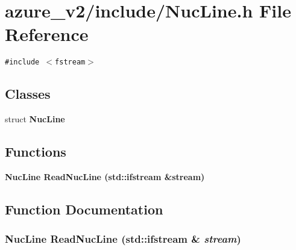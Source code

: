 \section{azure\_\-v2/include/Nuc\-Line.h File Reference}
\label{NucLine_8h}
{\tt \#include $<$fstream$>$}\par
\subsection*{Classes}
\begin{CompactItemize}
\item 
struct \bf{Nuc\-Line}
\end{CompactItemize}
\subsection*{Functions}
\begin{CompactItemize}
\item 
\bf{Nuc\-Line} \bf{Read\-Nuc\-Line} (std::ifstream \&stream)
\end{CompactItemize}


\subsection{Function Documentation}
\subsubsection{\setlength{\rightskip}{0pt plus 5cm}\bf{Nuc\-Line} Read\-Nuc\-Line (std::ifstream \& {\em stream})}\label{NucLine_8h_0f381544c852f5f5fe9b48e8b185b499}



